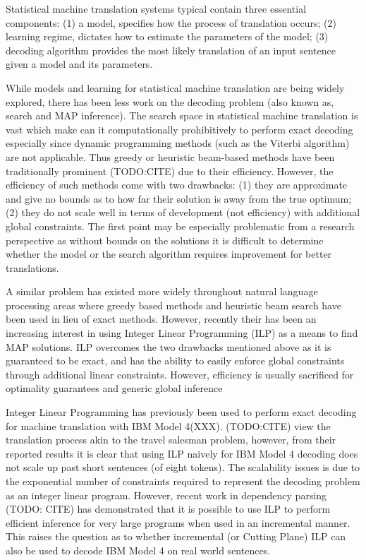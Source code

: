 Statistical machine translation systems typical contain three
essential components: (1) a model, specifies how the process of
translation occurs; (2) learning regime, dictates how to estimate the
parameters of the model; (3) decoding algorithm provides the most
likely translation of an input sentence given a model and its
parameters.

While models and learning for statistical machine translation are
being widely explored, there has been less work on the decoding
problem (also known as, search and MAP inference).  The search space
in statistical machine translation is vast which make can it
computationally prohibitively to perform exact decoding especially
since dynamic programming methods (such as the Viterbi algorithm) are
not applicable.  Thus greedy or heuristic beam-based methods have been
traditionally prominent (TODO:CITE) due to their efficiency.  However,
the efficiency of such methods come with two drawbacks: (1) they are
approximate and give no bounds as to how far their solution is away
from the true optimum; (2) they do not scale well in terms of
development (not efficiency) with additional global constraints.  The
first point may be especially problematic from a research perspective
as without bounds on the solutions it is difficult to determine
whether the model or the search algorithm requires improvement for
better translations.

A similar problem has existed more widely throughout natural language
processing areas where greedy based methods and heuristic beam search
have been used in lieu of exact methods.  However, recently their has
been an increasing interest in using Integer Linear Programming (ILP)
as a means to find MAP solutions.  ILP overcomes the two drawbacks
mentioned above as it is guaranteed to be exact, and has the ability
to easily enforce global constraints through additional linear
constraints.  However, efficiency is usually sacrificed for optimality
guarantees and generic global inference

Integer Linear Programming has previously been used to perform exact
decoding for machine translation with IBM Model 4(XXX).
(TODO:CITE) view the translation process akin to the travel salesman
problem, however, from their reported results it is clear that using
ILP naively for IBM Model 4 decoding does not scale up past short
sentences (of eight tokens).  The scalability issues is due to the
exponential number of constraints required to represent the decoding
problem as an integer linear program.  However, recent work in
dependency parsing (TODO: CITE) has demonstrated that it is possible
to use ILP to perform efficient inference for very large programs when
used in an incremental manner.  This raises the question as to whether
incremental (or Cutting Plane) ILP can also be used to decode IBM
Model 4 on real world sentences.


